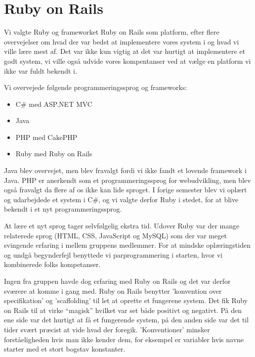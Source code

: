 ﻿\chapter{Ruby on Rails}
\label{akademiskror}

Vi valgte Ruby og frameworket Ruby on Rails som platform, efter flere overvejelser om hvad der var bedst at implementere vores system i og hvad vi ville lære mest af. Det var ikke kun vigtig at det var hurtigt at implementere et godt system, vi ville også udvide vores kompentanser ved at vælge en platform vi ikke var fuldt bekendt i.

Vi overvejede følgende programmeringssprog og frameworks:
\begin{itemize}
\item C\# med ASP.NET MVC
\item Java
\item PHP med CakePHP
\item Ruby med Ruby on Rails
\end{itemize}

Java blev overvejet, men blev fravalgt fordi vi ikke fandt et lovende framework i Java. PHP er anerkendt som et programmeringssprog for webudvikling, men blev også fravalgt da flere af os ikke kan lide sproget. I forige semester blev vi oplært og udarbejdede et system i C\#, og vi valgte derfor Ruby i stedet, for at blive bekendt i et nyt programmeringssprog.

At lære et nyt sprog tager selvfølgelig ekstra tid. Udover Ruby var der mange relaterede sprog (HTML, CSS, JavaScript og MySQL) som der var meget svingende erfaring i mellem gruppens medlemmer. For at mindske oplæringstiden og undgå begynderfejl benyttede vi parprogrammering i starten, hvor vi kombinerede folks kompetanser.

Ingen fra gruppen havde dog erfaring med Ruby on Rails og det var derfor sværere at komme i gang med. Ruby on Rails benytter 'konvention over specifikation' og 'scaffolding' til let at oprette et fungerene system. Det fik Ruby on Rails til at virke ``magisk'' hvilket var set både positivt og negativt. På den ene side var det hurtigt at få et fungerende system, på den anden side var det til tider svært præcist at vide hvad der foregik. 'Konventioner' minsker forståeligheden hvis man ikke kender dem, for eksempel er variabler hvis navne starter med et stort bogstav konstanter.


